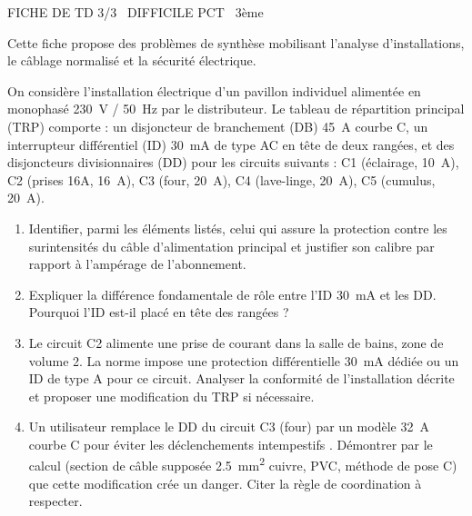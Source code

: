 \documentclass[11pt]{article}
\begin{document}
\begin{tcolorbox}[enhanced,colback=popink,colframe=popink,arc=10pt,boxrule=0pt,left=12pt,right=12pt,top=9pt,bottom=9pt]
{\color{white}\popxbold\small FICHE DE TD 3/3 \textbullet\ DIFFICILE \hfill PCT \textbullet\ 3ème\par}
\end{tcolorbox}
\vspace{4pt}
Cette fiche propose des problèmes de synthèse mobilisant l'analyse d'installations, le câblage normalisé et la sécurité électrique.

\begin{exercice}
On considère l'installation électrique d'un pavillon individuel alimentée en monophasé \SI{230}{V} / \SI{50}{Hz} par le distributeur. Le tableau de répartition principal (TRP) comporte : un disjoncteur de branchement (DB) \SI{45}{A} courbe C, un interrupteur différentiel (ID) \SI{30}{mA} de type AC en tête de deux rangées, et des disjoncteurs divisionnaires (DD) pour les circuits suivants : C1 (éclairage, \SI{10}{A}), C2 (prises 16A, \SI{16}{A}), C3 (four, \SI{20}{A}), C4 (lave-linge, \SI{20}{A}), C5 (cumulus, \SI{20}{A}).
\begin{enumerate}
    \item Identifier, parmi les éléments listés, celui qui assure la protection contre les surintensités du câble d'alimentation principal et justifier son calibre par rapport à l'ampérage de l'abonnement.
    \item Expliquer la différence fondamentale de rôle entre l'ID \SI{30}{mA} et les DD. Pourquoi l'ID est-il placé \og en tête \fg{} des rangées ?
    \item Le circuit C2 alimente une prise de courant dans la salle de bains, zone de volume 2. La norme impose une protection différentielle \SI{30}{mA} dédiée ou un ID de type A pour ce circuit. Analyser la conformité de l'installation décrite et proposer une modification du TRP si nécessaire.
    \item Un utilisateur remplace le DD du circuit C3 (four) par un modèle \SI{32}{A} courbe C \og pour éviter les déclenchements intempestifs \fg. Démontrer par le calcul (section de câble supposée \SI{2,5}{mm^2} cuivre, PVC, méthode de pose C) que cette modification crée un danger. Citer la règle de coordination à respecter.
\end{enumerate}
\end{exercice}
\end{document}
